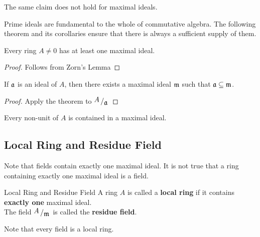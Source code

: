 \begin{note}
	The same claim does not hold for maximal ideals.
\end{note}

Prime ideals are fundamental to the whole of commutative algebra.
The following theorem and its corollaries ensure that there
is always a sufficient supply of them.

\begin{theorem}{}{}
	Every ring \( A \neq 0 \) has at least one maximal ideal.
\end{theorem}
\begin{proof}
	Follows from Zorn's Lemma
\end{proof}

\begin{corollary}{}{}
	If \( \mathfrak{a} \) is an ideal of \( A \), then there exists a
	maximal ideal \( \mathfrak{m} \) such that \( \mathfrak{a} \subseteq \mathfrak{m} \).
\end{corollary}
\begin{proof}
	Apply the theorem to \( \bigslant{A}{\mfa} \)
\end{proof}

\begin{corollary}{}{}
	Every non-unit of \( A \) is contained in a maximal ideal.
\end{corollary}


\subsection{Local Ring and Residue Field}

Note that fields contain exactly one maximal ideal.
It is not true that a ring containing exactly one maximal ideal is a field.
\begin{defn}{Local Ring and Residue Field}{}
	A ring \( A \) is called a \textbf{local ring} if it contains
	\textbf{exactly one} maximal ideal. \\
	The field \( \bigslant{A}{\mfm} \) is called the \textbf{residue field}.
\end{defn}
Note that every field is a local ring.

